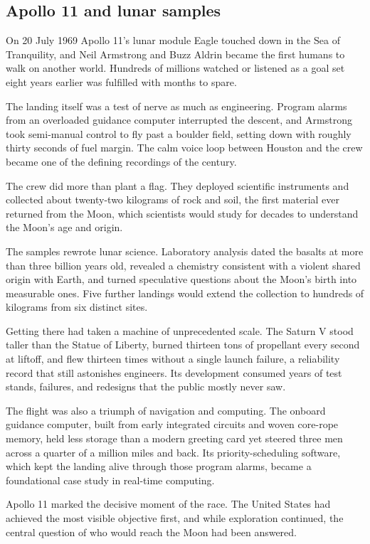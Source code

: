 \subsection{Apollo 11 and lunar samples}
On 20 July 1969 Apollo 11's lunar module Eagle touched down in the Sea of Tranquility, and Neil Armstrong and Buzz Aldrin became the first humans to walk on another world. Hundreds of millions watched or listened as a goal set eight years earlier was fulfilled with months to spare.

The landing itself was a test of nerve as much as engineering. Program alarms from an overloaded guidance computer interrupted the descent, and Armstrong took semi-manual control to fly past a boulder field, setting down with roughly thirty seconds of fuel margin. The calm voice loop between Houston and the crew became one of the defining recordings of the century.

The crew did more than plant a flag. They deployed scientific instruments and collected about twenty-two kilograms of rock and soil, the first material ever returned from the Moon, which scientists would study for decades to understand the Moon's age and origin.

The samples rewrote lunar science. Laboratory analysis dated the basalts at more than three billion years old, revealed a chemistry consistent with a violent shared origin with Earth, and turned speculative questions about the Moon's birth into measurable ones. Five further landings would extend the collection to hundreds of kilograms from six distinct sites.

Getting there had taken a machine of unprecedented scale. The Saturn V stood taller than the Statue of Liberty, burned thirteen tons of propellant every second at liftoff, and flew thirteen times without a single launch failure, a reliability record that still astonishes engineers. Its development consumed years of test stands, failures, and redesigns that the public mostly never saw.

The flight was also a triumph of navigation and computing. The onboard guidance computer, built from early integrated circuits and woven core-rope memory, held less storage than a modern greeting card yet steered three men across a quarter of a million miles and back. Its priority-scheduling software, which kept the landing alive through those program alarms, became a foundational case study in real-time computing.

Apollo 11 marked the decisive moment of the race. The United States had achieved the most visible objective first, and while exploration continued, the central question of who would reach the Moon had been answered. \cite{nasa2019} \cite{chaikin1994} \cite{logsdon2010}


